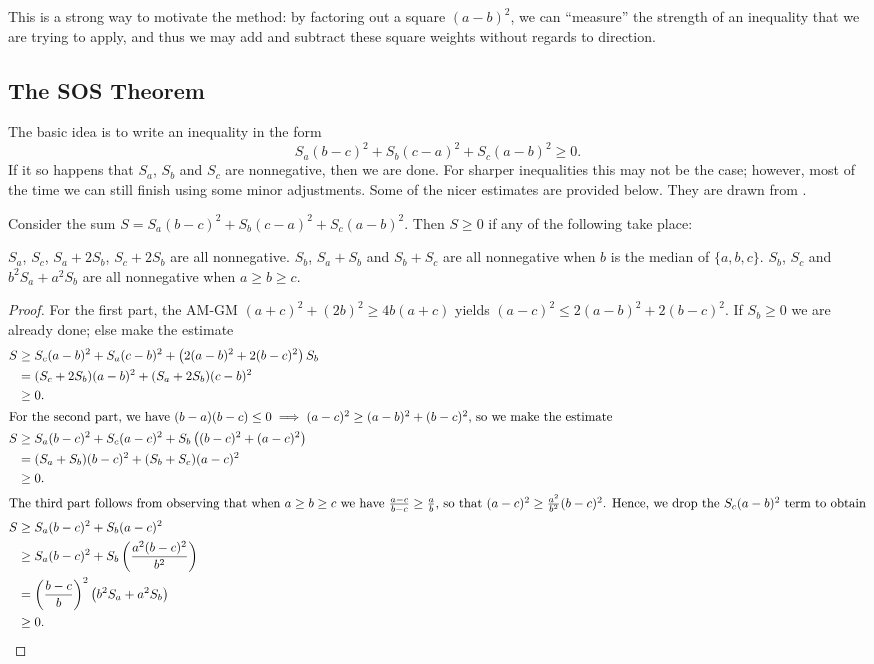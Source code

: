 \documentclass{scrartcl}
\begin{document}
This is a strong way to motivate the method:
by factoring out a square $(a-b)^2$, we can ``measure'' the strength of an inequality
that we are trying to apply, and thus we may add and subtract these square weights
without regards to direction.

\subsection{The SOS Theorem}
The basic idea is to write an inequality in the form
\[ S_a (b-c)^2 + S_b (c-a)^2 + S_c (a-b)^2 \ge 0. \]
If it so happens that $S_a$, $S_b$ and $S_c$ are nonnegative, then we are done.
For sharper inequalities this may not be the case;
however, most of the time we can still finish using some minor adjustments.
Some of the nicer estimates are provided below.
They are drawn from \cite{sos}.

\begin{theorem}
  \label{thm:sos}
  Consider the sum $S = S_a(b-c)^2 + S_b(c-a)^2 + S_c(a-b)^2$.
  Then $S \ge 0$ if any of the following take place:
  \begin{enumerate}[(i)]
    \ii $S_a$, $S_c$, $S_a + 2S_b$, $S_c + 2S_b$ are all nonnegative.
    \ii $S_b$, $S_a+S_b$ and $S_b+S_c$ are all nonnegative when $b$ is the median of $\{a,b,c\}$.
    \ii $S_b$, $S_c$ and $b^2S_a + a^2S_b$ are all nonnegative when $a \ge b \ge c$.
  \end{enumerate}
\end{theorem}
\begin{proof}
  For the first part, the AM-GM $(a+c)^2 + (2b)^2 \ge 4b(a+c)$
  yields $(a-c)^2 \le 2(a-b)^2 + 2(b-c)^2$.
  If $S_b \ge 0$ we are already done; else make the estimate
  \begin{align*}
    S &\ge S_c(a-b)^2 + S_a(c-b)^2 + \left(2(a-b)^2 + 2(b-c)^2\right) S_b \\
    &= (S_c+2S_b)(a-b)^2 + (S_a+2S_b)(c-b)^2 \\ &\ge 0. \\
    \intertext{For the second part,
      we have $(b-a)(b-c) \le 0 \implies (a-c)^2 \ge (a-b)^2 + (b-c)^2$,
      so we make the estimate}
    S &\ge S_a(b-c)^2 + S_c(a-c)^2 + S_b\left( (b-c)^2 + (a-c)^2 \right) \\
    &= (S_a + S_b)(b-c)^2 + (S_b + S_c)(a-c)^2 \\ &\ge 0. \\
    \intertext{The third part follows from observing that when $a \ge b \ge c$ we have
      $\frac{a-c}{b-c} \ge \frac{a}{b}$, so that $(a-c)^2 \ge \frac{a^2}{b^2}(b-c)^2$.
      Hence, we drop the $S_c(a-b)^2$ term to obtain}
    S &\ge S_a(b-c)^2 + S_b(a-c)^2 \\
    &\ge S_a (b-c)^2 + S_b \left( \frac{a^2(b-c)^2}{b^2} \right) \\
    &= \left( \frac{b-c}{b} \right)^2 \left( b^2S_a + a^2S_b \right) \\
    &\ge 0. \qedhere
  \end{align*}
\end{proof}
\end{document}
